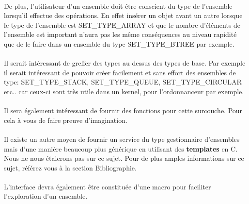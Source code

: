 \documentclass[10pt,a4wide]{article}
\begin{document}
\paragraph{}

De plus, l'utilisateur d'un ensemble doit \^etre conscient du type
de l'ensemble lorsqu'il effectue des op\'erations. En effet ins\'erer
un objet avant un autre lorsque le type de l'ensemble est SET\_TYPE\_ARRAY
et que le nombre d'\'el\'ements de l'ensemble est important n'aura pas les
m\^eme cons\'equences au niveau rapidit\'e que de le faire dans un
ensemble du type SET\_TYPE\_BTREE par exemple.

\paragraph{}

Il serait int\'eressant de greffer des types au dessus des types de base.
Par exemple il serait int\'eressant de pouvoir cr\'eer facilement et
sans effort des ensembles de type: SET\_TYPE\_STACK, SET\_TYPE\_QUEUE,
SET\_TYPE\_CIRCULAR etc.. car ceux-ci sont tr\`es utile dans un kernel,
pour l'ordonnanceur par exemple.

\paragraph{}

Il sera \'egalement int\'eressant de fournir des fonctions pour cette
surcouche. Pour cela \`a vous de faire preuve d'imagination.

\paragraph{}

Il existe un autre moyen de fournir un service du type gestionnaire d'ensembles
mais d'une mani\`ere beaucoup plus g\'en\'erique en utilisant des
\textbf{templates} en C. Nous ne nous \'etalerons pas sur ce sujet. Pour
de plus amples informations sur ce sujet, r\'ef\'erez vous \`a la
section Bibliographie.

\paragraph{}

L'interface devra \'egalement \^etre constitu\'ee d'une macro pour faciliter
l'exploration d'un ensemble.

\paragraph{}
\end{document}
